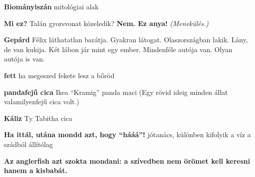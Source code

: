 \documentclass[a4paper]{memoir}
\newcommand{\f}[1]{\textbf{#1}} %
\newcommand{\e}{\hangpara{1.5em}{1}} %
\newcommand{\felix}[1]{\e \f{#1} \hspace{1ex}} %
\begin{document}
\felix{Biományiszán} mitológiai alak

\e \f{Mi ez?} Talán gyorsvonat közeledik? \f{Nem. Ez anya!} \textit{(Menekülés.)}

\felix{Gepárd} Félix láthatatlan barátja. Gyakran látogat. Olaszországban lakik. Lány, de van kukija. Két lábon jár mint egy ember. Mindenféle autója van. Olyan autója is van.

\felix{fett} ha megeszed fekete lesz a bőröd

\felix{pandafejű cica} Ikea ``Kramig'' panda maci (Egy rövid ideig minden állat valamilyenfejű cica volt.)

\felix{Káliz} Ty Tabitha cica

\felix{Ha ittál, utána mondd azt, hogy ``hááá''!} jótanács, különben kifolyik a víz a szádból állítólag

\felix{Az anglerfish azt szokta mondani: a szívedben nem örömet kell keresni hanem a kisbabát.}
\end{document}
